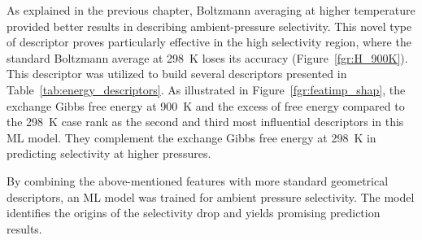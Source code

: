 \documentclass[main]{subfiles}
\begin{document}
As explained in the previous chapter, Boltzmann averaging at higher temperature provided better results in describing ambient-pressure selectivity. 
This novel type of descriptor proves particularly effective in the high selectivity region, where the standard Boltzmann average at \SI{298}{\kelvin} loses its accuracy (Figure~\ref{fgr:H_900K}). This descriptor was utilized to build several descriptors presented in Table~\ref{tab:energy_descriptors}. As illustrated in Figure~\ref{fgr:featimp_shap}, the exchange Gibbs free energy at \SI{900}{\kelvin} and the excess of free energy compared to the \SI{298}{\kelvin} case rank as the second and third most influential descriptors in this ML model. They complement the exchange Gibbs free energy at \SI{298}{\kelvin} in predicting selectivity at higher pressures.

By combining the above-mentioned features with more standard geometrical descriptors, an ML model was trained for ambient pressure selectivity. The model identifies the origins of the selectivity drop and yields promising prediction results.

\clearpage
\end{document}

